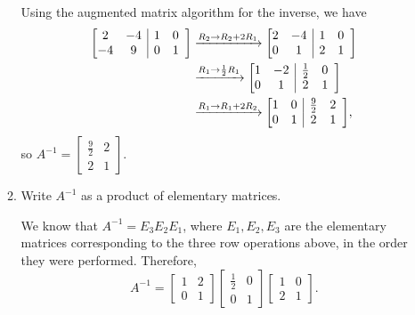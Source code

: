\documentclass[12pt]{article}
\makeatletter
\newenvironment{aamatrix}[1]{%
  \left[\begin{array}{@{}*{#1}{c}|cc}
}{%
  \end{array}\right]
}
\newcommand{\points}[1]{\marginpar{\hspace{24pt}[#1]}}
\makeatother
\begin{document}
\begin{enumerate}
\begin{enumerate}
\bigskip

 Using the augmented matrix algorithm for the inverse, we have
\begin{align*}
 \begin{aamatrix}{2}
  2&-4&1&0\\-4&9&0&1
 \end{aamatrix} & \xrightarrow[]{R_2\to R_2+2R_1}\begin{aamatrix}{2}
                                                2&-4&1&0\\0&1&2&1
                                               \end{aamatrix}\\
&\xrightarrow[]{R_1\to\frac{1}{2}R_1}\begin{aamatrix}{2}
                                      1&-2&\frac{1}{2}&0\\0&1&2&1
                                     \end{aamatrix}\\
&\xrightarrow[]{R_1\to R_1+2R_2}\begin{aamatrix}{2}
                                 1&0&\frac{9}{2}&2\\0&1&2&1
                                \end{aamatrix},
\end{align*}
so $A^{-1} = \begin{bmatrix}\frac{9}{2}&2\\2&1\end{bmatrix}$.

\bigskip


\item Write $A^{-1}$ as a product of elementary matrices. \points{3}


\bigskip

 We know that $A^{-1}=E_3E_2E_1$, where $E_1,E_2,E_3$ are the elementary matrices corresponding to the three row operations above, in the order they were performed. Therefore,
\[
 A^{-1}=\begin{bmatrix}1&2\\0&1\end{bmatrix}\begin{bmatrix}\frac{1}{2}&0\\0&1\end{bmatrix}\begin{bmatrix}1&0\\2&1\end{bmatrix}.
\]


\bigskip



\end{enumerate}
\end{enumerate}
\end{document}
